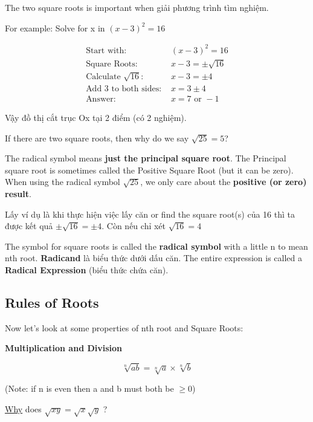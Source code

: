 The two square roots is important when giải phương trình tìm nghiệm. 

For example: Solve for x in $(x-3)^{2}=16$

\[
  \begin{aligned}
    \text{Start with: } &(x-3)^{2}=16\\
    \text{Square Roots: } &x-3= \pm \sqrt{16}\\
    \text{Calculate } \sqrt{16} \text{: } &x-3= \pm4\\
    \text{Add 3 to both sides: } &x=3 \pm 4\\
    \text{Answer: } &x=7 \text{ or } -1
  \end{aligned}
\]

Vậy đồ thị cắt trục Ox tại 2 điểm (có 2 nghiệm).

If there are two square roots, then why do we say $\sqrt{25}=5$?

The radical symbol means \textbf{just the principal square root}. The Principal square root is sometimes called the Positive Square Root (but it can be zero). When using the radical symbol $\sqrt{25}$, we only care about the \textbf{positive (or zero) result}.

Lấy ví dụ là khi thực hiện việc lấy căn or find the square root(s) của 16 thì ta được kết quả $\pm \sqrt{16}=\pm 4$. Còn nếu chỉ xét $\sqrt{16}=4$

The symbol for square roots \q{\(\sqrt{}\)} is called the \textbf{radical symbol} with a little n to mean nth root. \textbf{Radicand} là biểu thức dưới dấu căn. The entire expression is called a \textbf{Radical Expression} (biểu thức chứa căn).

\subsection{Rules of Roots}

Now let's look at some properties of nth root and Square Roots:

\textbf{Multiplication and Division}

\begin{equation}
  \sqrt[n]{ab}=\sqrt[n]{a} \times \sqrt[n]{b}
\end{equation}

(Note: if n is even then a and b must both be \(\geq 0\))

\href{https://www.mathsisfun.com/algebra/square-root.html}{Why} does $\sqrt{xy}=\sqrt{x}\sqrt{y}$ ?

\vspace{7 mm}

